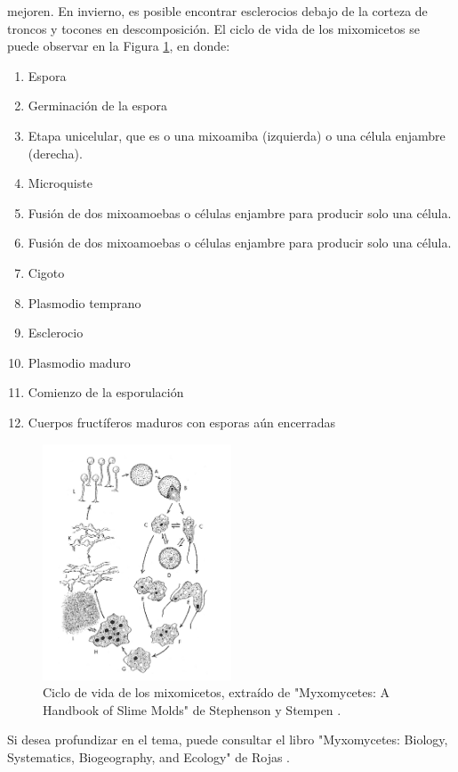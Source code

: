         mejoren. En invierno, es posible encontrar esclerocios debajo de la corteza de troncos y tocones en descomposici\'on.
    \vskip 0.5cm
    El ciclo de vida de los mixomicetos se puede observar en la Figura \ref{fig:MixomicetoCicloVida}, en donde: 
    \renewcommand{\labelenumi}{{\Alph{enumi}})} 
    \begin{enumerate}
        \item Espora 
        \item Germinaci\'on de la espora
        \item Etapa unicelular, que es o una mixoamiba (izquierda) o una c\'elula enjambre (derecha).
        \item Microquiste
        \item Fusi\'on de dos mixoamoebas o c\'elulas enjambre para producir solo una c\'elula.
        \item Fusi\'on de dos mixoamoebas o c\'elulas enjambre para producir solo una c\'elula.
        \item Cigoto
        \item Plasmodio temprano
        \item Esclerocio 
        \item Plasmodio maduro
        \item Comienzo de la esporulaci\'on 
        \item Cuerpos fruct\'iferos maduros con esporas a\'un encerradas
    \end{enumerate}
    \begin{figure}[h]
        \centering
        \includegraphics[width=0.5\textwidth]{./images/marco_teorico/Physarum/mixomiceto_ciclo_vida.png}
        \caption{Ciclo de vida de los mixomicetos, extra\'ido de "Myxomycetes: A Handbook of Slime Molds" de Stephenson y Stempen \cite{Stephenson1994}.}
        \label{fig:MixomicetoCicloVida}
    \end{figure}
    \vskip 0.5cm
    Si desea profundizar en el tema, puede consultar el libro "Myxomycetes: Biology, Systematics, Biogeography, and Ecology" de Rojas \cite{Rojas2017}.
    \vskip 0.5cm
    \clearpage